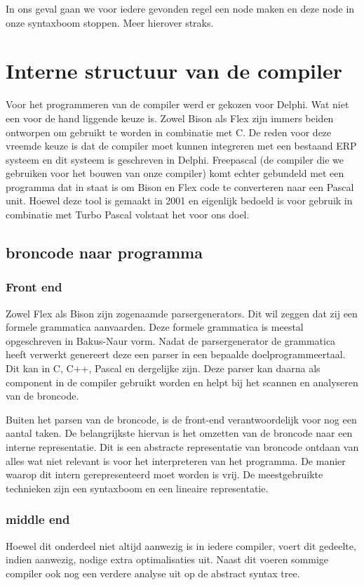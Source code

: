 \documentclass[12pt,a4paper]{article}
\begin{document}
In ons geval gaan we voor iedere gevonden regel een node maken en deze node in onze syntaxboom stoppen. Meer hierover straks.

\section{Interne structuur van de compiler}
Voor het programmeren van de compiler werd er gekozen voor Delphi. Wat niet een voor de hand liggende keuze is. Zowel Bison als Flex zijn immers beiden ontworpen om gebruikt te worden in combinatie met C. De reden voor deze vreemde keuze is dat de compiler moet kunnen integreren met een bestaand ERP systeem en dit systeem is geschreven in Delphi. Freepascal (de compiler die we gebruiken voor het bouwen van onze compiler) komt echter gebundeld met een programma dat in staat is om Bison en Flex code te converteren naar een Pascal unit. Hoewel deze tool is gemaakt in 2001 en eigenlijk bedoeld is voor gebruik in combinatie met Turbo Pascal volstaat het voor ons doel.

\subsection{broncode naar programma}

\subsubsection{Front end}
Zowel Flex als Bison zijn zogenaamde parsergenerators. Dit wil zeggen dat zij een formele grammatica aanvaarden. Deze formele grammatica is meestal opgeschreven in Bakus-Naur vorm. Nadat de parsergenerator de grammatica heeft verwerkt genereert deze een parser in een bepaalde doelprogrammeertaal. Dit kan in C, C++, Pascal en dergelijke zijn. Deze parser kan daarna als component in de compiler gebruikt worden en helpt bij het scannen en analyseren van de broncode.

Buiten het parsen van de broncode, is de front-end verantwoordelijk voor nog een aantal taken. De belangrijkste hiervan is het omzetten van de broncode naar een interne representatie. Dit is een abstracte representatie van broncode ontdaan van alles wat niet relevant is voor het interpreteren van het programma. De manier waarop dit intern gerepresenteerd moet worden is vrij. De meestgebruikte technieken zijn een syntaxboom en een lineaire representatie. 

\subsubsection{middle end}
Hoewel dit onderdeel niet altijd aanwezig is in iedere compiler, voert dit gedeelte, indien aanwezig, nodige extra optimalisaties uit. Naast dit voeren sommige compiler ook nog een verdere analyse uit op de abstract syntax tree.
\end{document}
